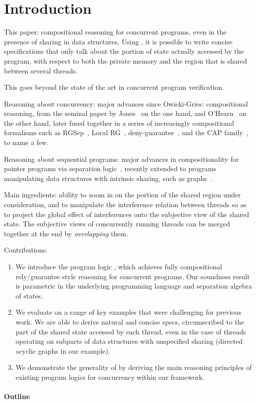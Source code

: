 \section{Introduction}

This paper: compositional reasoning for concurrent programs, even in
the presence of sharing in data structures. Using \colosl, it is
possible to write concise specifications that only talk about the
portion of state actually accessed by the program, with respect to
both the private memory and the region that is shared between several
threads.

This goes beyond the state of the art in concurrent program
verification.

Reasoning about concurrency: major advances since Owicki-Gries:
compositional reasoning, from the seminal paper by Jones~\cite{rg} on
the one hand, and O'Hearn~\cite{csl-orig,csl-tcs} on the other hand,
later fused together in a series of increasingly compositional
formalisms such as RGSep~\cite{viktor-marriage}, Local RG~\cite{lrg},
deny-guarantee~\cite{dg}, and the CAP
family~\cite{cap-ecoop10,icap,tada}, to name a few.

Reasoning about sequential programs: major advances in
compositionality for pointer programs via separation
logic~\cite{seplog}, recently extended to programs manipulating data
structures with intrinsic sharing, such as graphs~\cite{ramification}.

Main ingredients: ability to zoom in on the portion of the shared
region under consideration, and to manipulate the interference
relation between threads so as to project the global effect of
interferences onto the subjective view of the shared state. The
subjective views of concurrently running threads can be merged
together at the end by \emph{overlapping} them.

Contributions:
\begin{enumerate}
\item
  We introduce the program logic \colosl, which achieves fully
  compositional rely/guarantee style reasoning for concurrent
  programs. Our soundness result is parametric in the underlying
  programming language and separation algebra of states.
\item
  We evaluate \colosl on a range of key examples that were challenging
  for previous work. We are able to derive natural and concise specs,
  circumscribed to the part of the shared state accessed by each
  thread, even in the case of threads operating on subparts of data
  structures with unspecified sharing (directed acyclic graphs in our
  example).
\item
  We demonstrate the generality of \colosl by deriving the main
  reasoning principles of existing program logics for concurrency
  within our framework.
\end{enumerate}

\paragraph{Outline}
